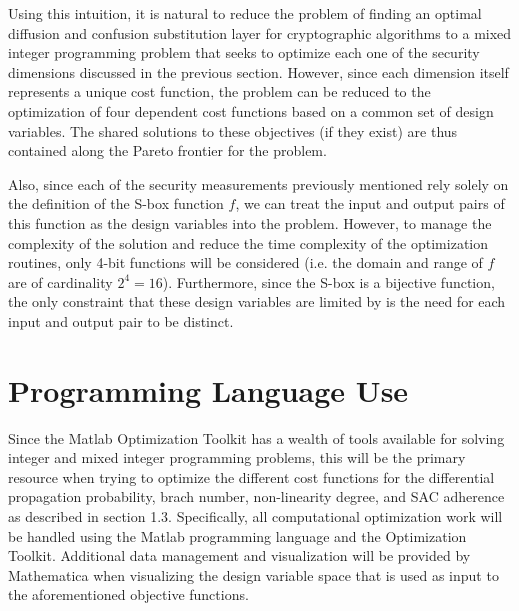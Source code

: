 \documentclass[11pt]{article}
\begin{document}
Using this intuition, it is natural to reduce the problem of finding an optimal diffusion and confusion substitution layer for cryptographic algorithms to a mixed integer programming problem that seeks to optimize each one of the security dimensions discussed in the previous section. However, since each dimension itself represents a unique cost function, the problem can be reduced to the optimization of four dependent cost functions based on a common set of design variables. The shared solutions to these objectives (if they exist) are thus contained along the Pareto frontier for the problem. 

Also, since each of the security measurements previously mentioned rely solely on the definition of the S-box function $f$, we can treat the input and output pairs of this function as the design variables into the problem. However, to manage the complexity of the solution and reduce the time complexity of the optimization routines, only 4-bit functions will be considered (i.e. the domain and range of $f$ are of cardinality $2^4 = 16$). Furthermore, since the S-box is a bijective function, the only constraint that these design variables are limited by is the need for each input and output pair to be distinct. 

\section{Programming Language Use}
Since the Matlab Optimization Toolkit has a wealth of tools available for solving integer and mixed integer programming problems, this will be the primary resource when trying to optimize the different cost functions for the differential propagation probability, brach number, non-linearity degree, and SAC adherence as described in section 1.3. Specifically, all computational optimization work will be handled using the Matlab programming language and the Optimization Toolkit. Additional data management and visualization will be provided by Mathematica when visualizing the design variable space that is used as input to the aforementioned objective functions.


\end{document}
